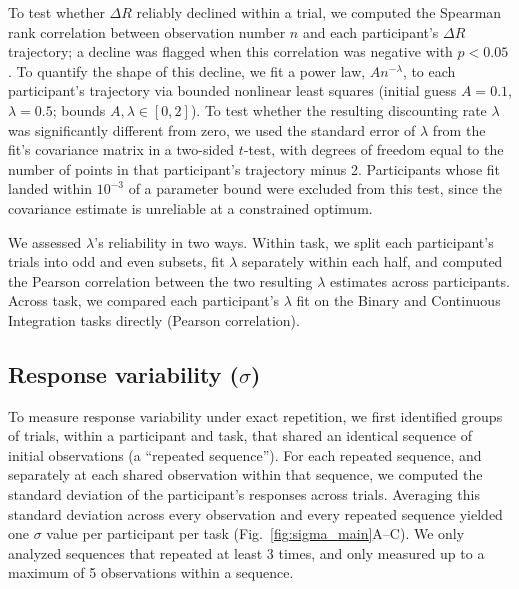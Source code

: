 \documentclass[12pt]{article}
\begin{document}
To test whether $\Delta R$ reliably declined within a trial, we computed the Spearman rank correlation between observation number $n$ and each participant's $\Delta R$ trajectory; a decline was flagged when this correlation was negative with $p<0.05$. To quantify the shape of this decline, we fit a power law, $A n^{-\lambda}$, to each participant's trajectory via bounded nonlinear least squares (initial guess $A=0.1$, $\lambda=0.5$; bounds $A,\lambda \in [0,2]$). To test whether the resulting discounting rate $\lambda$ was significantly different from zero, we used the standard error of $\lambda$ from the fit's covariance matrix in a two-sided $t$-test, with degrees of freedom equal to the number of points in that participant's trajectory minus 2. Participants whose fit landed within $10^{-3}$ of a parameter bound were excluded from this test, since the covariance estimate is unreliable at a constrained optimum.

We assessed $\lambda$'s reliability in two ways. Within task, we split each participant's trials into odd and even subsets, fit $\lambda$ separately within each half, and computed the Pearson correlation between the two resulting $\lambda$ estimates across participants. Across task, we compared each participant's $\lambda$ fit on the Binary and Continuous Integration tasks directly (Pearson correlation).

\subsection{Response variability ($\sigma$)}
To measure response variability under exact repetition, we first identified groups of trials, within a participant and task, that shared an identical sequence of initial observations (a ``repeated sequence''). For each repeated sequence, and separately at each shared observation within that sequence, we computed the standard deviation of the participant's responses across trials. Averaging this standard deviation across every observation and every repeated sequence yielded one $\sigma$ value per participant per task (Fig.~\ref{fig:sigma_main}A--C). We only analyzed sequences that repeated at least 3 times, and only measured up to a maximum of 5 observations within a sequence.
\end{document}
